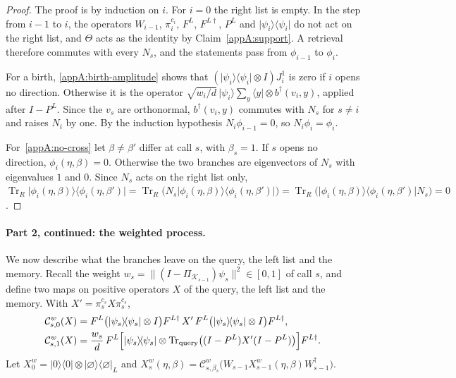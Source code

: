 \documentclass[11pt,letterpaper]{article}
\theoremstyle{definition}\newtheorem{definition}[theorem]{Definition}
\newcommand{\Tr}{\operatorname{Tr}}
\newcommand{\ket}[1]{\lvert#1\rangle}
\newcommand{\bra}[1]{\langle#1\rvert}
\newcommand{\proj}[1]{\ket{#1}\!\bra{#1}}
\newcommand{\norm}[1]{\lVert#1\rVert}
\begin{document}
\begin{proof}
The proof is by induction on $i$. For $i=0$ the right list is empty. In
the step from
$i-1$ to $i$, the operators $W_{i-1}$, $\pi^{c_i}_i$, $F^L$,
$F^{L\dagger}$, $P^L$ and $\proj{\psi_i}$ do not act on the right
list, and $\Theta$ acts as the identity by Claim~\ref{appA:support}.
A retrieval therefore commutes with every $N_s$, and the statements
pass from $\phi_{i-1}$ to $\phi_i$.

For a birth, \eqref{appA:birth-amplitude} shows that
$(\proj{\psi_i}\otimes I)J^1_i$ is zero if $i$ opens no direction.
Otherwise it is the operator
$\sqrt{w_i/d}\,\ket{\psi_i}\sum_y\bra y\otimes b^\dagger(v_i,y)$,
applied after $I-P^L$. Since
the $v_s$ are orthonormal, $b^\dagger(v_i,y)$ commutes with $N_s$ for
$s\ne i$ and raises $N_i$ by one. By the induction hypothesis
$N_i\phi_{i-1}=0$, so $N_i\phi_i=\phi_i$.

For~\eqref{appA:no-cross} let $\beta\ne\beta'$ differ at call $s$,
with $\beta_s=1$. If $s$ opens no direction, $\phi_i(\eta,\beta)=0$.
Otherwise the two branches are eigenvectors of $N_s$ with eigenvalues
$1$ and $0$. Since $N_s$ acts on the right list only,
$\Tr_R\ket{\phi_i(\eta,\beta)}\bra{\phi_i(\eta,\beta')}
=\Tr_R\bigl(N_s\ket{\phi_i(\eta,\beta)}\bra{\phi_i(\eta,\beta')}\bigr)
=\Tr_R\bigl(\ket{\phi_i(\eta,\beta)}\bra{\phi_i(\eta,\beta')}N_s\bigr)=0$.
\end{proof}

\paragraph{Part 2, continued: the weighted process.}
We now describe what the branches leave on the query, the left list
and the memory. Recall the weight
$w_s=\norm{(I-\Pi_{\mathcal K_{s-1}})\psi_s}^2\in[0,1]$ of call $s$,
and define two maps on positive operators $X$ of the query, the left
list and the memory. With
$X'=\pi^{c_s}_sX\pi^{c_s}_s$,
\begin{equation}\label{appA:weighted}
\begin{aligned}
 \mathcal C^{w}_{s,0}(X)&=F^L\bigl(\proj{\psi_s}\otimes I\bigr)F^{L\dagger}
   \,X'\,F^L\bigl(\proj{\psi_s}\otimes I\bigr)F^{L\dagger},\\
 \mathcal C^{w}_{s,1}(X)&=\frac{w_s}{d}\,
   F^L\Bigl[\proj{\psi_s}\otimes
   \Tr_{\rm query}\bigl((I-P^L)X'(I-P^L)\bigr)\Bigr]F^{L\dagger}.
\end{aligned}
\end{equation}
Let $X^{w}_0=\proj0\otimes\proj\varnothing_L$ and
$X^{w}_s(\eta,\beta)=\mathcal C^{w}_{s,\beta_s}\bigl(
W_{s-1}X^{w}_{s-1}(\eta,\beta)W_{s-1}^\dagger\bigr)$.
\end{document}
